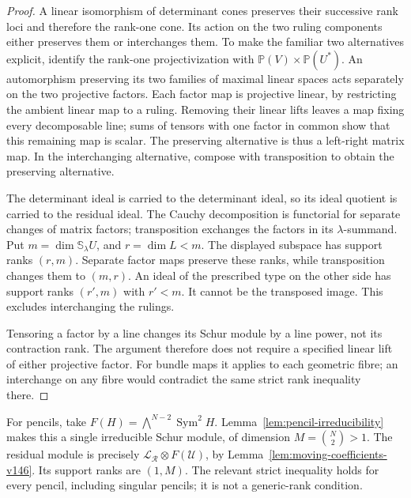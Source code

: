 \documentclass[11pt,reqno]{amsart}
\numberwithin{equation}{section}
\theoremstyle{definition}\newtheorem{definition}[theorem]{Definition}
\theoremstyle{remark}\newtheorem{remark}[theorem]{Remark}
\newcommand{\Pj}{\mathbb P}\newcommand{\A}{\mathbb A}
\DeclareMathOperator{\Sym}{Sym}\DeclareMathOperator{\Gr}{Gr}
\begin{document}
\begin{proof}
A linear isomorphism of determinant cones preserves their successive
rank loci and therefore the rank-one cone.  Its action on the two
ruling components either preserves them or interchanges them.  To
make the familiar two alternatives explicit, identify the rank-one
projectivization with \(\Pj(V)\times\Pj(U^*)\).  An automorphism
preserving its two families of maximal linear spaces acts separately
on the two projective factors.  Each factor map is projective linear,
by restricting the ambient linear map to a ruling.  Removing their
linear lifts leaves a map fixing every decomposable line; sums of
tensors with one factor in common show that this remaining map is
scalar.  The preserving alternative is thus a left-right matrix
map.  In the interchanging alternative, compose with transposition
to obtain the preserving alternative.

The determinant ideal is carried to the determinant ideal, so its
ideal quotient is carried to the residual ideal.  The Cauchy
decomposition is functorial for separate changes of matrix factors;
transposition exchanges the factors in its \(\lambda\)-summand.
Put \(m=\dim\mathbb S_\lambda U\), and \(r=\dim L<m\).
The displayed subspace has support ranks \((r,m)\).  Separate
factor maps preserve these ranks, while transposition changes them
to \((m,r)\).  An ideal of the prescribed type on the other side
has support ranks \((r',m)\) with \(r'<m\).  It cannot be the
transposed image.  This excludes interchanging the rulings.

Tensoring a factor by a line changes its Schur module by a line
power, not its contraction rank.  The argument therefore does not
require a specified linear lift of either projective factor.  For
bundle maps it applies to each geometric fibre; an interchange on
any fibre would contradict the same strict rank inequality there.
\end{proof}

For pencils, take
\(F(H)=\bigwedge^{N-2}\Sym^2H\).
Lemma~\ref{lem:pencil-irreducibility} makes this a single irreducible
Schur module, of dimension \(M=\binom N2>1\).  The residual module
is precisely
\(\mathcal L_{\mathcal R}\otimes F(\mathcal U)\), by
Lemma~\ref{lem:moving-coefficients-v146}.  Its support ranks are
\((1,M)\).  The relevant strict inequality holds for every pencil,
including singular pencils; it is not a generic-rank condition.
\end{document}
